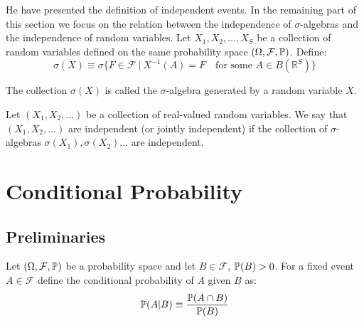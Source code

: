 \documentclass[11pt]{article} %
\begin{document}
He have presented the definition of independent events. In the remaining part of this section we focus on the relation between the independence of $\sigma$-algebras and the independence of random variables. Let $X_1, X_2, \ldots ,X_S$ be a collection of random variables defined on the same probability space $(\Omega, \mathcal{F}, \mathbb{P})$. Define:
$$ \sigma(X) \equiv \sigma \{F \in \mathcal{F} \: | \: X^{-1}(A) = F \quad \text{for some } A \in B(\mathbb{R}^{S}) \} $$

\noindent The collection $\sigma(X)$ is called the $\sigma$-algebra generated by a random variable $X$. 

\begin{definition}  Let $(X_1, X_2, \ldots)$ be a collection of real-valued random variables. We say that $(X_1, X_2, \ldots)$ are independent (or jointly independent) if the collection of $\sigma$-algebras $\sigma(X_1), \sigma(X_2) \ldots $ are independent. 
\end{definition}


\section{Conditional Probability}
\subsection{Preliminaries}
\begin{definition}  Let $(\Omega, \mathcal{F}, \mathbb{P})$ be a probability space and let $B \in \mathcal{F}$, $\mathbb{P}(B)>0$. For a fixed event $A \in \mathcal{F}$ define the conditional probability of $A$ given $B$ as:
$$\mathbb{P}(A | B) \equiv \frac{\mathbb{P}(A \cap B)}{\mathbb{P}(B)}  $$  
\end{definition} 
\end{document}

